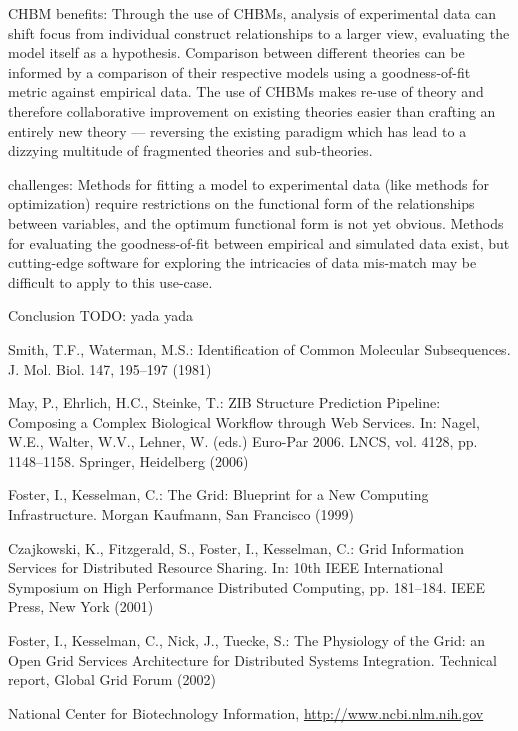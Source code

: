 \documentclass[runningheads,a4paper]{llncs}
\begin{document}
CHBM benefits:
Through the use of CHBMs, analysis of experimental data can shift focus from individual construct relationships to a larger view, evaluating the model itself as a hypothesis.
Comparison between different theories can be informed by a comparison of their respective models using a goodness-of-fit metric against empirical data.
The use of CHBMs makes re-use of theory and therefore collaborative improvement on existing theories easier than crafting an entirely new theory --- reversing the existing paradigm which has lead to a dizzying multitude of fragmented theories and sub-theories.

challenges:
Methods for fitting a model to experimental data (like methods for optimization) require restrictions on the functional form of the relationships between variables, and the optimum functional form is not yet obvious.
Methods for evaluating the goodness-of-fit between empirical and simulated data exist, but cutting-edge software for exploring the intricacies of data mis-match may be difficult to apply to this use-case.

Conclusion
TODO: yada yada


\begin{thebibliography}{4}

 Smith, T.F., Waterman, M.S.: Identification of Common Molecular
Subsequences. J. Mol. Biol. 147, 195--197 (1981)

 May, P., Ehrlich, H.C., Steinke, T.: ZIB Structure Prediction Pipeline:
Composing a Complex Biological Workflow through Web Services. In: Nagel,
W.E., Walter, W.V., Lehner, W. (eds.) Euro-Par 2006. LNCS, vol. 4128,
pp. 1148--1158. Springer, Heidelberg (2006)

 Foster, I., Kesselman, C.: The Grid: Blueprint for a New Computing
Infrastructure. Morgan Kaufmann, San Francisco (1999)

 Czajkowski, K., Fitzgerald, S., Foster, I., Kesselman, C.: Grid
Information Services for Distributed Resource Sharing. In: 10th IEEE
International Symposium on High Performance Distributed Computing, pp.
181--184. IEEE Press, New York (2001)

 Foster, I., Kesselman, C., Nick, J., Tuecke, S.: The Physiology of the
Grid: an Open Grid Services Architecture for Distributed Systems
Integration. Technical report, Global Grid Forum (2002)

 National Center for Biotechnology Information, \url{http://www.ncbi.nlm.nih.gov}

\end{thebibliography}
\end{document}
